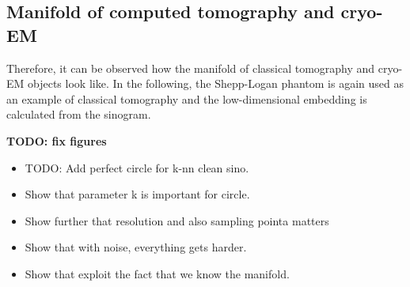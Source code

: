 \subsection{Manifold of computed tomography and cryo-EM}

Therefore, it can be observed how the manifold of classical tomography and cryo-EM objects look like.
In the following, the Shepp-Logan phantom is again used as an example of classical tomography
and the low-dimensional embedding is calculated from the sinogram.



\textbf{TODO: fix figures}
\begin{itemize}
    
    \item TODO: Add perfect circle for k-nn clean sino.
    \item Show that parameter k is important for circle.
    \item Show further that resolution and also sampling pointa matters
    \item Show that with noise, everything gets harder.
    \item Show that exploit the fact that we know the manifold.
\end{itemize}







